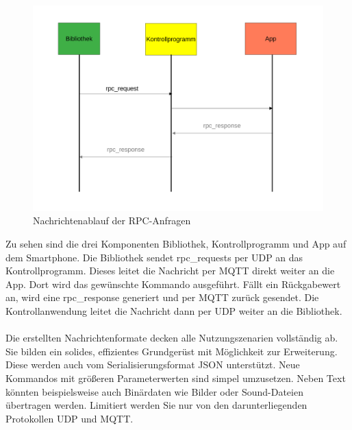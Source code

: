 \documentclass[11pt,a4paper]{report}
\begin{document}
\begin{figure}[htbp]
\centering
\includegraphics[width=.9\textwidth]{images/message_flow_rpc.pdf}
\caption{Nachrichtenablauf der RPC-Anfragen}
\label{fig:message_flow_rpc}
\end{figure}
Zu sehen sind die drei Komponenten Bibliothek, Kontrollprogramm und App auf dem Smartphone.
Die Bibliothek sendet rpc\_requests per UDP an das Kontrollprogramm.
Dieses leitet die Nachricht per MQTT direkt weiter an die App.
Dort wird das gewünschte Kommando ausgeführt.
Fällt ein Rückgabewert an, wird eine rpc\_response generiert und per MQTT zurück gesendet.
Die Kontrollanwendung leitet die Nachricht dann per UDP weiter an die Bibliothek.
\\\\
Die erstellten Nachrichtenformate decken alle Nutzungszenarien vollständig ab.
Sie bilden ein solides, effizientes Grundgerüst mit Möglichkeit zur Erweiterung.
Diese werden auch vom Serialisierungsformat JSON unterstützt.
Neue Kommandos mit größeren Parameterwerten sind simpel umzusetzen.
Neben Text könnten beispielsweise auch Binärdaten wie Bilder oder Sound-Dateien übertragen werden.
Limitiert werden Sie nur von den darunterliegenden Protokollen UDP und MQTT.
\end{document}
